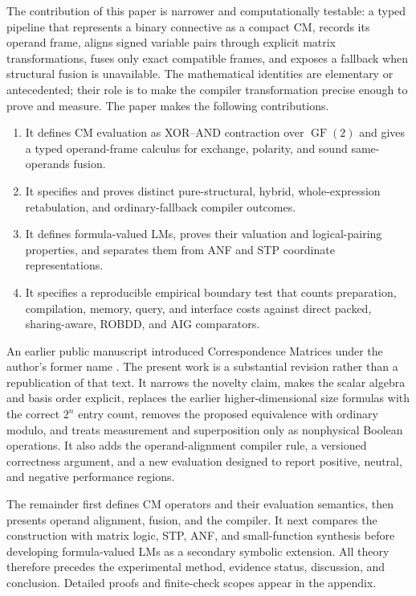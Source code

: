 \documentclass[11pt]{article}
\newcommand{\GFtwo}{\operatorname{GF}(2)}
\begin{document}
The contribution of this paper is narrower and computationally testable: a
typed pipeline that represents a binary connective as a compact CM, records
its operand frame, aligns signed variable pairs through explicit matrix
transformations, fuses only exact compatible frames, and exposes a fallback
when structural fusion is unavailable. The mathematical identities are
elementary or antecedented; their role is to make the compiler transformation
precise enough to prove and measure. The paper makes the following
contributions.

\begin{enumerate}
  \item It defines CM evaluation as XOR--AND contraction over $\GFtwo$ and gives
  a typed operand-frame calculus for exchange, polarity, and sound
  same-operands fusion.
  \item It specifies and proves distinct pure-structural, hybrid,
  whole-expression retabulation, and ordinary-fallback compiler outcomes.
  \item It defines formula-valued LMs, proves their valuation and
  logical-pairing properties, and separates them from ANF and STP coordinate
  representations.
  \item It specifies a reproducible empirical boundary test that counts
  preparation, compilation, memory, query, and interface costs against direct
  packed, sharing-aware, ROBDD, and AIG comparators.
\end{enumerate}

An earlier public manuscript introduced Correspondence Matrices under the
author's former name \citep{droncheff2018}. The present work is a substantial
revision rather than a republication of that text. It narrows the novelty
claim, makes the scalar algebra and basis order explicit, replaces the earlier
higher-dimensional size formulas with the correct $2^n$ entry count, removes
the proposed equivalence with ordinary modulo, and treats measurement and
superposition only as nonphysical Boolean operations. It also adds the
operand-alignment compiler rule, a versioned correctness argument, and a new
evaluation designed to report positive, neutral, and negative performance
regions.

The remainder first defines CM operators and their evaluation semantics, then
presents operand alignment, fusion, and the compiler. It next compares the
construction with matrix logic, STP, ANF, and small-function synthesis before
developing formula-valued LMs as a secondary symbolic extension. All theory
therefore precedes the experimental method, evidence status, discussion, and
conclusion. Detailed proofs and finite-check scopes appear in the appendix.
\end{document}
